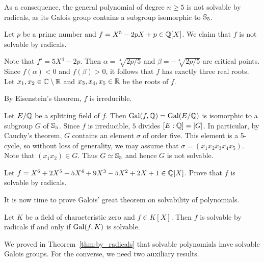 As a consequence, the general polynomial of degree $n\geq5$ 
is not solvable by radicals, as its Galois group contains a subgroup isomorphic to $\mathbb{S}_5$. 

\begin{example}
    Let $p$ be a prime number and $f=X^5-2pX+p\in\mathbb{Q}[X]$. 
    We claim that 
    $f$ is not solvable by radicals. 

    Note that $f'=5X^4-2p$. Then $\alpha=\sqrt[4]{2p/5}$ and $\beta=-\sqrt[4]{2p/5}$
    are critical points. Since $f(\alpha)<0$ and $f(\beta)>0$, it follows that $f$ has
    exactly three real roots. Let 
    $x_1,x_2\in\mathbb{C}\setminus\mathbb{R}$ and $x_3,x_4,x_5\in\mathbb{R}$ be the roots
    of $f$. 
    
    By Eisenstein's theorem, $f$ is irreducible. 
    
    Let $E/\mathbb{Q}$ be a splitting field of $f$. 
    Then $\operatorname{Gal}(f,\mathbb{Q})=\operatorname{Gal}(E/\mathbb{Q})$ is isomorphic 
    to a subgroup $G$ of $\mathbb{S}_5$.
    Since 
    $f$ is irreducible, $5$ divides $[E:\mathbb{Q}]=|G|$. In particular, 
    by Cauchy's theorem, $G$ contains an element $\sigma$ of order five. This element
    is a 5-cycle, so without loss of generality, we may assume that 
    $\sigma=(x_1x_2x_3x_4x_5)$. Note that 
    $(x_1x_2)\in G$. Thus $G\simeq\mathbb{S}_5$ and hence
    $G$ is not solvable. 
\end{example}

\begin{exercise}
    Let $f=X^6+2X^5-5X^4+9X^3-5X^2+2X+1\in\mathbb{Q}[X]$. 
    Prove that $f$ is solvable by radicals. 
\end{exercise}



It is now time to prove Galois' great theorem on solvability 
of polynomials. 

\begin{theorem}[Galois]
\label{thm:Galois_great}
    Let $K$ be a field of characteristic zero and $f\in K[X]$. 
    Then $f$ is solvable by radicals if and only if $\operatorname{Gal}(f,K)$ is solvable. 
\end{theorem}

We proved in Theorem~\ref{thm:by_radicals} that solvable 
polynomials have solvable Galois groups. 
For the converse, we need two auxiliary results. 

